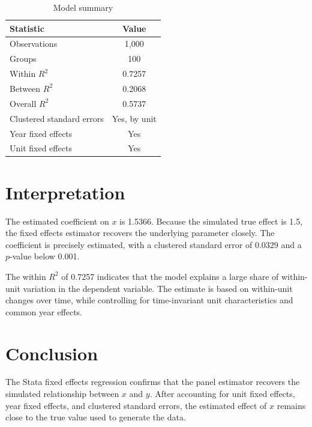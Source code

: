 \documentclass[12pt]{article}
\begin{document}
\begin{table}[h]
\centering
\begin{tabular}{lc}
\toprule
Statistic & Value \\
\midrule
Observations & 1,000 \\
Groups & 100 \\
Within $R^2$ & 0.7257 \\
Between $R^2$ & 0.2068 \\
Overall $R^2$ & 0.5737 \\
Clustered standard errors & Yes, by unit \\
Year fixed effects & Yes \\
Unit fixed effects & Yes \\
\bottomrule
\end{tabular}
\caption{Model summary}
\end{table}

\section{Interpretation}

The estimated coefficient on $x$ is 1.5366. Because the simulated true effect is
1.5, the fixed effects estimator recovers the underlying parameter closely. The
coefficient is precisely estimated, with a clustered standard error of 0.0329
and a $p$-value below 0.001.

The within $R^2$ of 0.7257 indicates that the model explains a large share of
within-unit variation in the dependent variable. The estimate is based on
within-unit changes over time, while controlling for time-invariant unit
characteristics and common year effects.

\section{Conclusion}

The Stata fixed effects regression confirms that the panel estimator recovers
the simulated relationship between $x$ and $y$. After accounting for unit fixed
effects, year fixed effects, and clustered standard errors, the estimated effect
of $x$ remains close to the true value used to generate the data.
\end{document}
